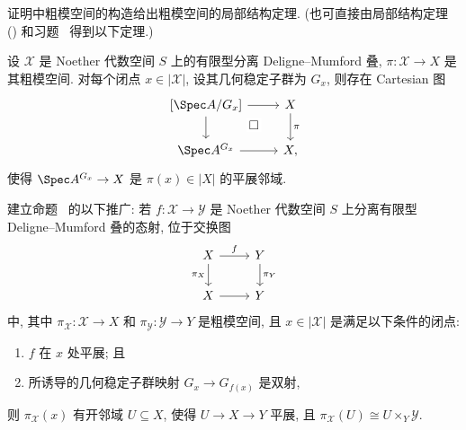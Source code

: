 证明中粗模空间的构造给出粗模空间的局部结构定理. (也可直接由局部结构定理 () 和习题~ 得到以下定理.)
\begin{corollary}[粗模空间的局部结构]\label{src:5.4.13}
设 $\mathcal X$ 是 Noether 代数空间 $S$ 上的有限型分离 Deligne--Mumford 叠, $\pi:\mathcal X\to X$ 是其粗模空间. 对每个闭点 $x\in|\mathcal X|$, 设其几何稳定子群为 $G_x$, 则存在 Cartesian 图
\[
\begin{tikzcd}
{[\Spec A/G_x]}\arrow[r]\arrow[d]&\mathcal X\arrow[d,"\pi"]\\
\Spec A^{G_x}\arrow[r]\arrow[ur,phantom,"\square" description]&X,
\end{tikzcd}
\]
使得 $\Spec A^{G_x}\to X$ 是 $\pi(x)\in|X|$ 的平展邻域.
\end{corollary}
\begin{exercise}\label{src:5.4.14}
建立命题~ 的以下推广: 若 $f:\mathcal X\to\mathcal Y$ 是 Noether 代数空间 $S$ 上分离有限型 Deligne--Mumford 叠的态射, 位于交换图
\[
\begin{tikzcd}
\mathcal X\arrow[r,"f"]\arrow[d,"\pi_{\mathcal X}"']&\mathcal Y\arrow[d,"\pi_{\mathcal Y}"]\\
X\arrow[r]&Y
\end{tikzcd}
\]
中, 其中 $\pi_{\mathcal X}:\mathcal X\to X$ 和 $\pi_{\mathcal Y}:\mathcal Y\to Y$ 是粗模空间, 且 $x\in|\mathcal X|$ 是满足以下条件的闭点:
\begin{enumerate}[(1)]
\item $f$ 在 $x$ 处平展; 且
\item 所诱导的几何稳定子群映射 $G_x\to G_{f(x)}$ 是双射,
\end{enumerate}
则 $\pi_{\mathcal X}(x)$ 有开邻域 $U\subseteq X$, 使得 $U\to X\to Y$ 平展, 且 $\pi_{\mathcal X}(U)\cong U\times_Y\mathcal Y$.
\end{exercise}


